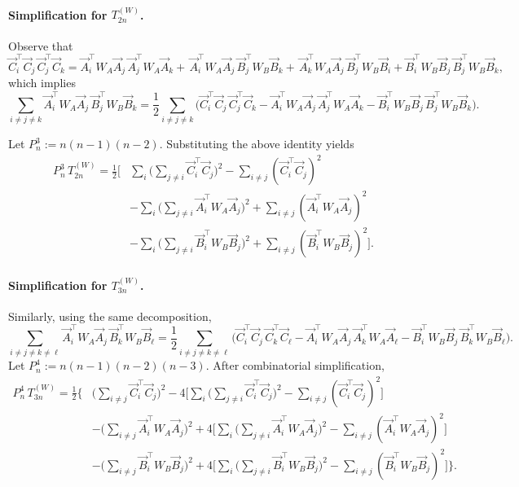 \documentclass[12pt,reqno,oneside]{amsbook}
\theoremstyle{definition}
\theoremstyle{remark}
\begin{document}
\paragraph{Simplification for $T_{2n}^{(W)}$.}
Observe that
\[
\vec C_i^\top \vec C_j\, \vec C_j^\top \vec C_k
=
\vec A_i^\top W_A \vec A_j\, \vec A_j^\top W_A \vec A_k
+
\,\vec A_i^\top W_A \vec A_j\, \vec B_j^\top W_B \vec B_k
+
\,\vec A_k^\top W_A \vec A_j\, \vec B_j^\top W_B \vec B_i
+
\vec B_i^\top W_B \vec B_j\, \vec B_j^\top W_B \vec B_k,
\]
which implies
\[
\sum_{i\neq j\neq k}\vec A_i^\top W_A \vec A_j\, \vec B_j^\top W_B \vec B_k
=
\frac{1}{2}
\sum_{i\neq j\neq k}\Big(
\vec C_i^\top \vec C_j\, \vec C_j^\top \vec C_k
-
\vec A_i^\top W_A \vec A_j\, \vec A_j^\top W_A \vec A_k
-
\vec B_i^\top W_B \vec B_j\, \vec B_j^\top W_B \vec B_k
\Big).
\]

Let $P_n^3 := n(n-1)(n-2)$. Substituting the above identity yields
\[
\begin{aligned}
P_n^3\, T_{2n}^{(W)}
=
\frac{1}{2}\Bigg[
&\sum_i \Big( \sum_{j\neq i} \vec C_i^\top \vec C_j \Big)^2
- \sum_{i\neq j} (\vec C_i^\top \vec C_j)^2 \\
&- \sum_i \Big( \sum_{j\neq i} \vec A_i^\top W_A \vec A_j \Big)^2
+ \sum_{i\neq j} (\vec A_i^\top W_A \vec A_j)^2 \\
&- \sum_i \Big( \sum_{j\neq i} \vec B_i^\top W_B \vec B_j \Big)^2
+ \sum_{i\neq j} (\vec B_i^\top W_B \vec B_j)^2
\Bigg].
\end{aligned}
\]

\paragraph{Simplification for $T_{3n}^{(W)}$.}
Similarly, using the same decomposition,
\[
\sum_{i\neq j\neq k\neq \ell} \vec A_i^\top W_A \vec A_j\, \vec B_k^\top W_B \vec B_\ell
=
\frac{1}{2}
\sum_{i\neq j\neq k\neq \ell}\Big(
\vec C_i^\top \vec C_j\, \vec C_k^\top \vec C_\ell
-
\vec A_i^\top W_A \vec A_j\, \vec A_k^\top W_A \vec A_\ell
-
\vec B_i^\top W_B \vec B_j\, \vec B_k^\top W_B \vec B_\ell
\Big).
\]
Let $P_n^4 := n(n-1)(n-2)(n-3)$. After combinatorial simplification,
\[
\begin{aligned}
P_n^4\, T_{3n}^{(W)}
=
\frac{1}{2}\Bigg\{
&\Big( \sum_{i\neq j} \vec C_i^\top \vec C_j \Big)^2
- 4\Bigg[
\sum_i \Big( \sum_{j\neq i} \vec C_i^\top \vec C_j \Big)^2
- \sum_{i\neq j} (\vec C_i^\top \vec C_j)^2
\Bigg] \\
&- \Big( \sum_{i\neq j} \vec A_i^\top W_A \vec A_j \Big)^2
+ 4\Bigg[
\sum_i \Big( \sum_{j\neq i} \vec A_i^\top W_A \vec A_j \Big)^2
- \sum_{i\neq j} (\vec A_i^\top W_A \vec A_j)^2
\Bigg] \\
&- \Big( \sum_{i\neq j} \vec B_i^\top W_B \vec B_j \Big)^2
+ 4\Bigg[
\sum_i \Big( \sum_{j\neq i} \vec B_i^\top W_B \vec B_j \Big)^2
- \sum_{i\neq j} (\vec B_i^\top W_B \vec B_j)^2
\Bigg]
\Bigg\}.
\end{aligned}
\]
\end{document}
